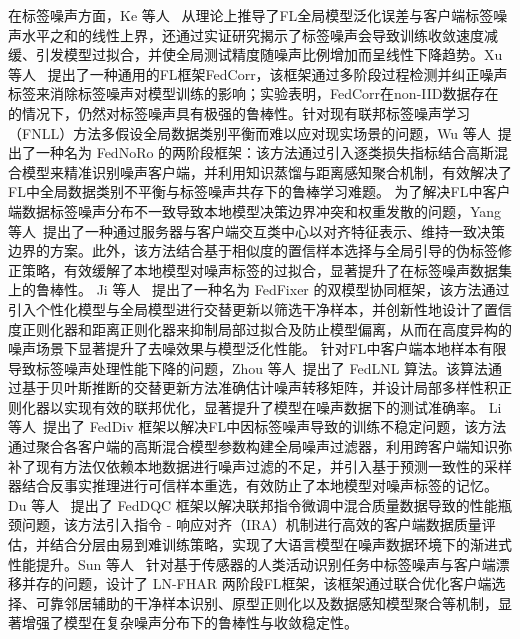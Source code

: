 在标签噪声方面，Ke 等人~\cite{ke2023impact} 从理论上推导了FL全局模型泛化误差与客户端标签噪声水平之和的线性上界，还通过实证研究揭示了标签噪声会导致训练收敛速度减缓、引发模型过拟合，并使全局测试精度随噪声比例增加而呈线性下降趋势。Xu 等人~\cite{xu2022fedcorr} 提出了一种通用的FL框架FedCorr，该框架通过多阶段过程检测并纠正噪声标签来消除标签噪声对模型训练的影响；实验表明，FedCorr在non-IID数据存在的情况下，仍然对标签噪声具有极强的鲁棒性。针对现有联邦标签噪声学习（FNLL）方法多假设全局数据类别平衡而难以应对现实场景的问题，Wu 等人~\cite{wu2023fednoro}提出了一种名为 FedNoRo 的两阶段框架：该方法通过引入逐类损失指标结合高斯混合模型来精准识别噪声客户端，并利用知识蒸馏与距离感知聚合机制，有效解决了FL中全局数据类别不平衡与标签噪声共存下的鲁棒学习难题。
为了解决FL中客户端数据标签噪声分布不一致导致本地模型决策边界冲突和权重发散的问题，Yang 等人~\cite{yang2022robust}提出了一种通过服务器与客户端交互类中心以对齐特征表示、维持一致决策边界的方案。此外，该方法结合基于相似度的置信样本选择与全局引导的伪标签修正策略，有效缓解了本地模型对噪声标签的过拟合，显著提升了在标签噪声数据集上的鲁棒性。
Ji 等人~\cite{ji2024fedfixer} 提出了一种名为 FedFixer 的双模型协同框架，该方法通过引入个性化模型与全局模型进行交替更新以筛选干净样本，并创新性地设计了置信度正则化器和距离正则化器来抑制局部过拟合及防止模型偏离，从而在高度异构的噪声场景下显著提升了去噪效果与模型泛化性能。
针对FL中客户端本地样本有限导致标签噪声处理性能下降的问题，Zhou 等人~\cite{zhou2024federated}提出了 FedLNL 算法。该算法通过基于贝叶斯推断的交替更新方法准确估计噪声转移矩阵，并设计局部多样性积正则化器以实现有效的联邦优化，显著提升了模型在噪声数据下的测试准确率。%
Li 等人~\cite{li2024feddiv}提出了 FedDiv 框架以解决FL中因标签噪声导致的训练不稳定问题，该方法通过聚合各客户端的高斯混合模型参数构建全局噪声过滤器，利用跨客户端知识弥补了现有方法仅依赖本地数据进行噪声过滤的不足，并引入基于预测一致性的采样器结合反事实推理进行可信样本重选，有效防止了本地模型对噪声标签的记忆。
Du 等人~\cite{du2025feddqc} 提出了 FedDQC 框架以解决联邦指令微调中混合质量数据导致的性能瓶颈问题，该方法引入指令 - 响应对齐（IRA）机制进行高效的客户端数据质量评估，并结合分层由易到难训练策略，实现了大语言模型在噪声数据环境下的渐进式性能提升。Sun 等人~\cite{sun2025label} 针对基于传感器的人类活动识别任务中标签噪声与客户端漂移并存的问题，设计了 LN-FHAR 两阶段FL框架，该框架通过联合优化客户端选择、可靠邻居辅助的干净样本识别、原型正则化以及数据感知模型聚合等机制，显著增强了模型在复杂噪声分布下的鲁棒性与收敛稳定性。

